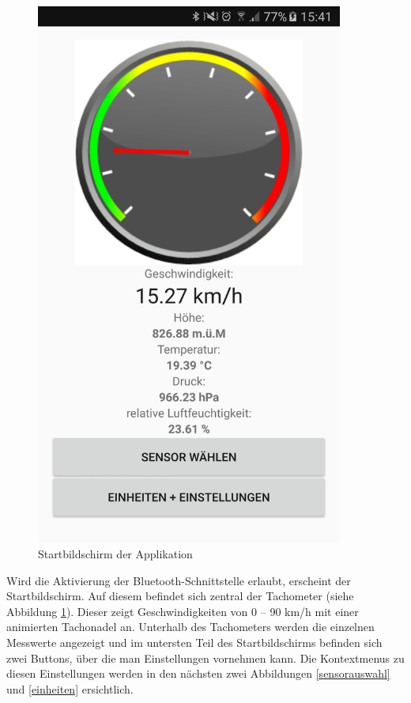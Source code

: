 \begin{figure}[ht]
\begin{minipage}[t]{0.5\textwidth}
    \includegraphics[width=0.9\textwidth]{4Resultate/imag/APPHomeScreen.png} 
    \caption{Startbildschirm der Applikation}
    \label{tacho}
 \end{minipage}
\end{figure}

Wird die Aktivierung der Bluetooth-Schnittstelle erlaubt, erscheint der Startbildschirm. Auf diesem befindet sich zentral der Tachometer (siehe Abbildung \ref{tacho}). Dieser zeigt Geschwindigkeiten von 0 – 90 km/h mit einer animierten Tachonadel an. Unterhalb des Tachometers werden die einzelnen Messwerte angezeigt und im untersten Teil des Startbildschirms befinden sich zwei Buttons, über die man Einstellungen vornehmen kann. Die Kontextmenus zu diesen Einstellungen werden in den nächsten zwei Abbildungen \ref{sensorauswahl} und \ref{einheiten} ersichtlich. 

